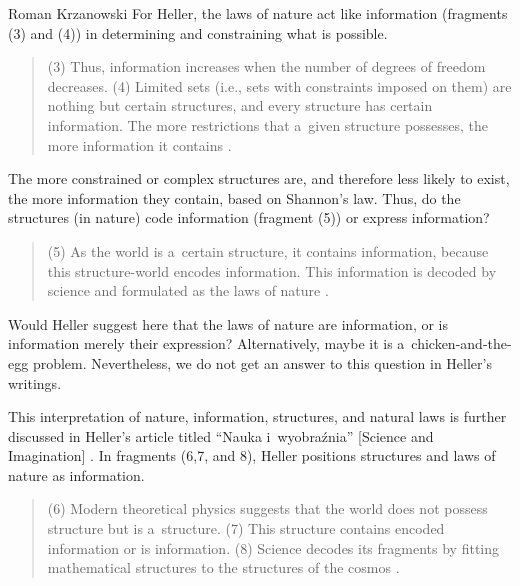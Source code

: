 \begin{artengenv}{Roman Krzanowski}
For Heller, the laws of nature act like information (fragments (3) and (4)) in determining and constraining what is possible.



\begin{quote}
(3) Thus, information increases when the number of degrees of freedom decreases. (4) Limited sets (i.e., sets with constraints imposed on them) are nothing but certain structures, and every structure has certain information. The more restrictions that a~given structure possesses, the more information it contains 
\parencite[][pp.62–63]{heller_filozofia_2009}.%

\end{quote}



The more constrained or complex structures are, and therefore less likely to exist, the more information they contain, based on Shannon's law. Thus, do the structures (in nature) code information (fragment (5)) or express information?



\begin{quote}
(5) As the world is a~certain structure, it contains information, because this structure-world encodes information. This information is decoded by science and formulated as the laws of nature 
\parencite[][pp.62–63]{heller_filozofia_2009}.%
\end{quote}




Would Heller suggest here that the laws of nature are information, or is information merely their expression? Alternatively, maybe it is a~chicken-and-the-egg problem. Nevertheless, we do not get an answer to this question in Heller's writings.



This interpretation of nature, information, structures, and natural laws is further discussed in Heller's article titled ``Nauka i~wyobraźnia'' [Science and Imagination] 
\parencite[][]{heller_nauka_1995}. %
 In fragments (6,7, and 8), Heller positions structures and laws of nature as information.



\begin{quote}
(6) Modern theoretical physics suggests that the world does not possess structure but is a~structure. (7) This structure contains encoded information or is information. (8) Science decodes its fragments by fitting mathematical structures to the structures of the cosmos 
\parencite[][p.170]{heller_nauka_1995}.%
\end{quote}





\end{artengenv}
